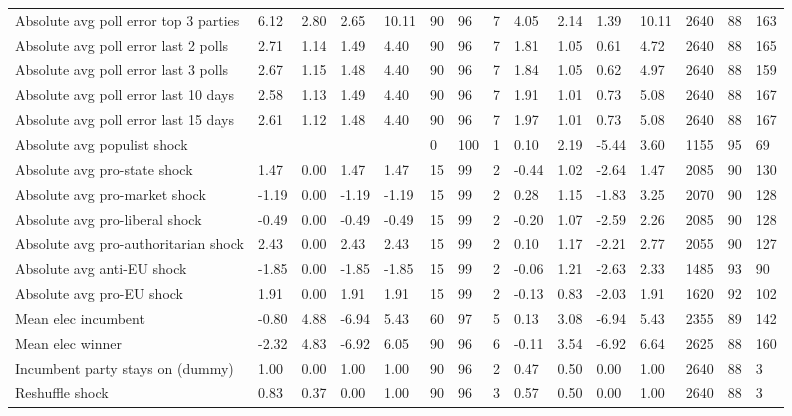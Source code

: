 \begin{longtable}{lllllllllllllll}
\addlinespace
Absolute avg poll error top 3 parties & 6.12 & 2.80 & 2.65 & 10.11 & 90 & 96 & 7 & 4.05 & 2.14 & 1.39 & 10.11 & 2640 & 88 & 163\\
Absolute avg poll error last 2 polls & 2.71 & 1.14 & 1.49 & 4.40 & 90 & 96 & 7 & 1.81 & 1.05 & 0.61 & 4.72 & 2640 & 88 & 165\\
Absolute avg poll error last 3 polls & 2.67 & 1.15 & 1.48 & 4.40 & 90 & 96 & 7 & 1.84 & 1.05 & 0.62 & 4.97 & 2640 & 88 & 159\\
Absolute avg poll error last 10 days & 2.58 & 1.13 & 1.49 & 4.40 & 90 & 96 & 7 & 1.91 & 1.01 & 0.73 & 5.08 & 2640 & 88 & 167\\
Absolute avg poll error last 15 days & 2.61 & 1.12 & 1.48 & 4.40 & 90 & 96 & 7 & 1.97 & 1.01 & 0.73 & 5.08 & 2640 & 88 & 167\\
\addlinespace
Absolute avg populist shock &  &  &  &  & 0 & 100 & 1 & 0.10 & 2.19 & -5.44 & 3.60 & 1155 & 95 & 69\\
Absolute avg pro-state shock & 1.47 & 0.00 & 1.47 & 1.47 & 15 & 99 & 2 & -0.44 & 1.02 & -2.64 & 1.47 & 2085 & 90 & 130\\
Absolute avg pro-market shock & -1.19 & 0.00 & -1.19 & -1.19 & 15 & 99 & 2 & 0.28 & 1.15 & -1.83 & 3.25 & 2070 & 90 & 128\\
Absolute avg pro-liberal shock & -0.49 & 0.00 & -0.49 & -0.49 & 15 & 99 & 2 & -0.20 & 1.07 & -2.59 & 2.26 & 2085 & 90 & 128\\
Absolute avg pro-authoritarian shock & 2.43 & 0.00 & 2.43 & 2.43 & 15 & 99 & 2 & 0.10 & 1.17 & -2.21 & 2.77 & 2055 & 90 & 127\\
\addlinespace
Absolute avg anti-EU shock & -1.85 & 0.00 & -1.85 & -1.85 & 15 & 99 & 2 & -0.06 & 1.21 & -2.63 & 2.33 & 1485 & 93 & 90\\
Absolute avg pro-EU shock & 1.91 & 0.00 & 1.91 & 1.91 & 15 & 99 & 2 & -0.13 & 0.83 & -2.03 & 1.91 & 1620 & 92 & 102\\
Mean elec incumbent & -0.80 & 4.88 & -6.94 & 5.43 & 60 & 97 & 5 & 0.13 & 3.08 & -6.94 & 5.43 & 2355 & 89 & 142\\
Mean elec winner & -2.32 & 4.83 & -6.92 & 6.05 & 90 & 96 & 6 & -0.11 & 3.54 & -6.92 & 6.64 & 2625 & 88 & 160\\
Incumbent party stays on (dummy) & 1.00 & 0.00 & 1.00 & 1.00 & 90 & 96 & 2 & 0.47 & 0.50 & 0.00 & 1.00 & 2640 & 88 & 3\\
\addlinespace
Reshuffle shock & 0.83 & 0.37 & 0.00 & 1.00 & 90 & 96 & 3 & 0.57 & 0.50 & 0.00 & 1.00 & 2640 & 88 & 3\\

\end{longtable}
